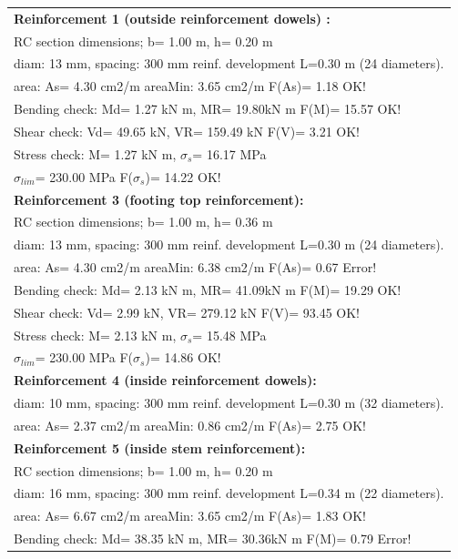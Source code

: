 \begin{center}
\begin{supertabular}[H]{|l|}
\hline
\textbf{Reinforcement 1 (outside reinforcement dowels) :} \\
  RC section dimensions; b= 1.00 m, h= 0.20 m\\
  diam: 13 mm, spacing: 300 mm  reinf. development L=0.30 m (24 diameters).\\
  area: As=   4.30 cm2/m areaMin:   3.65 cm2/m  F(As)= 1.18 OK!\\
  Bending check: Md=   1.27 kN m, MR=  19.80kN m  F(M)= 15.57 OK!\\
  Shear check: Vd=  49.65 kN,  VR= 159.49 kN  F(V)= 3.21 OK!\\
  Stress check: M=   1.27 kN m, $\sigma_s$=  16.17 MPa\\
    $\sigma_{lim}$= 230.00 MPa  F($\sigma_s$)= 14.22 OK!\\
\textbf{Reinforcement 3 (footing top reinforcement):}\\
  RC section dimensions; b= 1.00 m, h= 0.36 m\\
  diam: 13 mm, spacing: 300 mm  reinf. development L=0.30 m (24 diameters).\\
  area: As=   4.30 cm2/m areaMin:   6.38 cm2/m  F(As)= 0.67 Error!\\
  Bending check: Md=   2.13 kN m, MR=  41.09kN m  F(M)= 19.29 OK!\\
  Shear check: Vd=   2.99 kN,  VR= 279.12 kN  F(V)= 93.45 OK!\\
  Stress check: M=   2.13 kN m, $\sigma_s$=  15.48 MPa\\
    $\sigma_{lim}$= 230.00 MPa  F($\sigma_s$)= 14.86 OK!\\
\textbf{Reinforcement 4 (inside reinforcement dowels):}\\
  diam: 10 mm, spacing: 300 mm  reinf. development L=0.30 m (32 diameters).\\
  area: As=   2.37 cm2/m areaMin:   0.86 cm2/m  F(As)= 2.75 OK!\\
\textbf{Reinforcement 5 (inside stem reinforcement):}\\
  RC section dimensions; b= 1.00 m, h= 0.20 m\\
  diam: 16 mm, spacing: 300 mm  reinf. development L=0.34 m (22 diameters).\\
  area: As=   6.67 cm2/m areaMin:   3.65 cm2/m  F(As)= 1.83 OK!\\
  Bending check: Md=  38.35 kN m, MR=  30.36kN m  F(M)= 0.79 Error!\\

\end{supertabular}
\end{center}
